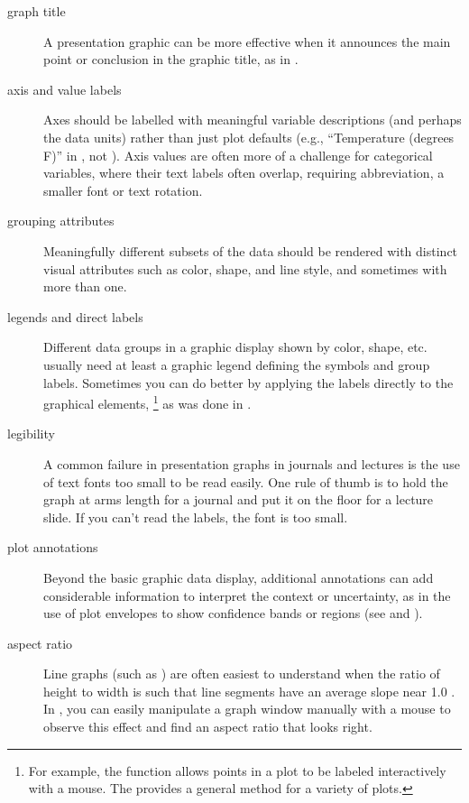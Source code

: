 \documentclass[10pt,krantz2]{krantz}\usepackage[]{graphicx}\usepackage[]{color}
\begin{document}
\begin{description}

\item[graph title] A presentation graphic can be more effective when it announces
 the main point or conclusion in the graphic title, as in .

\item[axis and value labels] Axes should be labelled with meaningful variable descriptions
 (and perhaps the data units) rather than just plot defaults (e.g., ``Temperature (degrees F)''
 in , not ).
 Axis values are often more of a challenge for categorical variables, where their text
 labels often overlap, requiring abbreviation, a smaller font or text rotation.

\item[grouping attributes] Meaningfully different subsets of the data should be
 rendered with distinct visual attributes such as color, shape, and line style,
 and sometimes with more than one.

 \item[legends and direct labels] Different data groups in a graphic display
 shown by color, shape, etc.  usually need at least a graphic legend defining
 the symbols and group labels. Sometimes you can do better by applying the
 labels directly to the graphical elements,%
 \footnote{
 For example, the  function allows points in a plot to be labeled
 interactively with a mouse.  The  provides a general
 method for a variety of plots.
 }
 as was done in .

 \item[legibility] A common failure in presentation graphs in journals
 and lectures is the use of text fonts too small to be read easily.
 One rule of thumb is to hold the graph at arms length for a journal
 and put it on the floor for a lecture slide.  If you can't read the
 labels, the font is too small.

 \item [plot annotations] Beyond the basic graphic data display, additional
 annotations can add considerable information to interpret the context
 or uncertainty, as in the use of plot envelopes to show confidence bands
 or regions (see  and ).

 \item[aspect ratio] Line graphs (such as )
 are often easiest to understand when the ratio of
 height to width is such that line segments have an average slope
 near 1.0 \citep{Cleveland-etal:88:shape}.
 In \R, you can easily manipulate a graph window manually with a
 mouse to observe this effect and find an aspect ratio that looks
 right.


\end{description}
\end{document}
